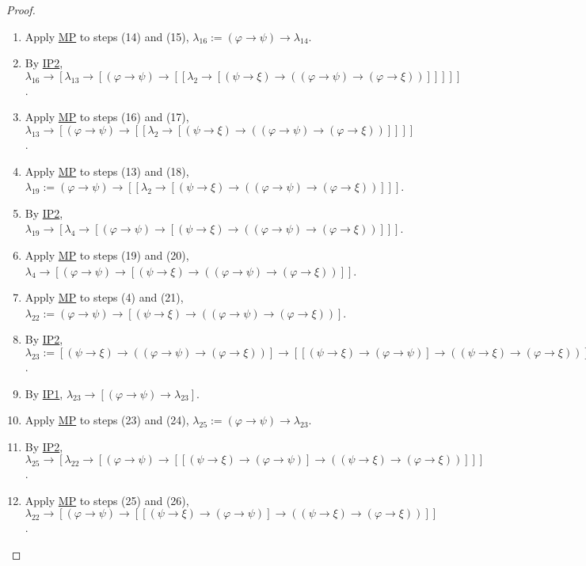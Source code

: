 \documentclass{treatise}
\begin{document}
\begin{proof}
\begin{enumerate}
    \item Apply \hyperref[HPL-R-MP]{MP} to steps (14) and (15), $\lambda_{16} := (\varphi \to \psi) \to \lambda_{14}$.
    \\
    \item By \hyperref[HPL-A-IP2]{IP2}, $\lambda_{16} \to [\lambda_{13} \to [(\varphi \to \psi) \to [[\lambda_2 \to [(\psi \to \xi) \to ((\varphi \to \psi) \to (\varphi \to \xi))]]]]]$.
    \item Apply \hyperref[HPL-R-MP]{MP} to steps (16) and (17), $\lambda_{13} \to [(\varphi \to \psi) \to [[\lambda_2 \to [(\psi \to \xi) \to ((\varphi \to \psi) \to (\varphi \to \xi))]]]]$.
    \item Apply \hyperref[HPL-R-MP]{MP} to steps (13) and (18), $\lambda_{19} := (\varphi \to \psi) \to [[\lambda_2 \to [(\psi \to \xi) \to ((\varphi \to \psi) \to (\varphi \to \xi))]]]$.
    \\
    \item By \hyperref[HPL-A-IP2]{IP2}, $\lambda_{19} \to [\lambda_4 \to [(\varphi \to \psi) \to [(\psi \to \xi) \to ((\varphi \to \psi) \to (\varphi \to \xi))]]]$.
    \item Apply \hyperref[HPL-R-MP]{MP} to steps (19) and (20), $\lambda_4 \to [(\varphi \to \psi) \to [(\psi \to \xi) \to ((\varphi \to \psi) \to (\varphi \to \xi))]]$.
    \item Apply \hyperref[HPL-R-MP]{MP} to steps (4) and (21), $\lambda_{22} := (\varphi \to \psi) \to [(\psi \to \xi) \to ((\varphi \to \psi) \to (\varphi \to \xi))]$.
    \\
    \item By \hyperref[HPL-A-IP2]{IP2}, $\lambda_{23} := [(\psi \to \xi) \to ((\varphi \to \psi) \to (\varphi \to \xi))] \to [[(\psi \to \xi) \to (\varphi \to \psi)] \to ((\psi \to \xi) \to (\varphi \to \xi))]$.
    \item By \hyperref[HPL-A-IP1]{IP1}, $\lambda_{23} \to [(\varphi \to \psi) \to \lambda_{23}]$.
    \item Apply \hyperref[HPL-R-MP]{MP} to steps (23) and (24), $\lambda_{25} := (\varphi \to \psi) \to \lambda_{23}$.
    \\
    \item By \hyperref[HPL-A-IP2]{IP2}, $\lambda_{25} \to [\lambda_{22} \to [(\varphi \to \psi) \to [[(\psi \to \xi) \to (\varphi \to \psi)] \to ((\psi \to \xi) \to (\varphi \to \xi))]]]$.
    \item Apply \hyperref[HPL-R-MP]{MP} to steps (25) and (26), $\lambda_{22} \to [(\varphi \to \psi) \to [[(\psi \to \xi) \to (\varphi \to \psi)] \to ((\psi \to \xi) \to (\varphi \to \xi))]]$.

\end{enumerate}
\end{proof}
\end{document}
